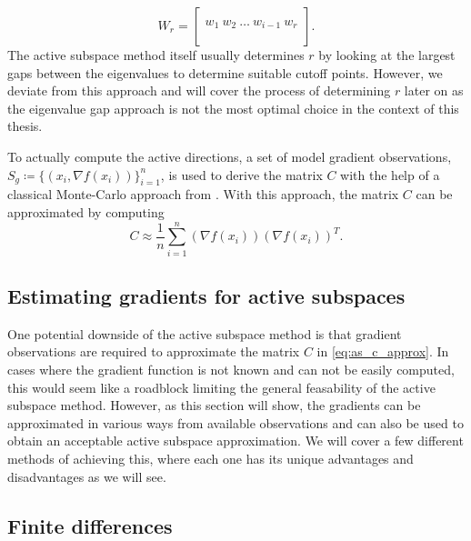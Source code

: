 \documentclass[
  a4paper,  %
  twoside,  %
  bibliography=totoc,
  headsepline,
  cleardoublepage=empty,
  parskip=half,
  draft=false
]{scrbook}
\begin{document}
\begin{equation}
W_r=\begin{bmatrix}
  \\
    w_1 ~ w_2 ~ \dots ~ w_{i-1} ~ w_r\\
    \\
  \end{bmatrix}.
\label{basis}
\end{equation}
%
The active subspace method itself usually determines $r$ by looking at the largest gaps between the eigenvalues to determine suitable cutoff points.
However, we deviate from this approach and will cover the process of determining $r$ later on as the eigenvalue gap approach is not the most optimal choice in the context of this thesis.

To actually compute the active directions, a set of model gradient observations, $S_g \coloneqq \{(x_i, \nabla f(x_i))\}_{i=1}^n$, is used to derive the matrix $C$ with the help of a classical Monte-Carlo approach from \cite{Constantine2014}.
With this approach, the matrix $C$ can be approximated by computing
\begin{equation}
C \approx \frac{1}{n} \sum_{i=1}^n  \left(\nabla f(x_i)\right) \left(\nabla f(x_i)\right)^T.
\label{eq:as_c_approx}
\end{equation}

\subsection{Estimating gradients for active subspaces}
\label{sec:as_est}

One potential downside of the active subspace method is that gradient observations are required to approximate the matrix $C$ in \cref{eq:as_c_approx}.
In cases where the gradient function is not known and can not be easily computed, this would seem like a roadblock limiting the general feasability of the active subspace method.
However, as this section will show, the gradients can be approximated in various ways from available observations and can also be used to obtain an acceptable active subspace approximation.
We will cover a few different methods of achieving this, where each one has its unique advantages and disadvantages as we will see.

\subsection{Finite differences}
\end{document}
